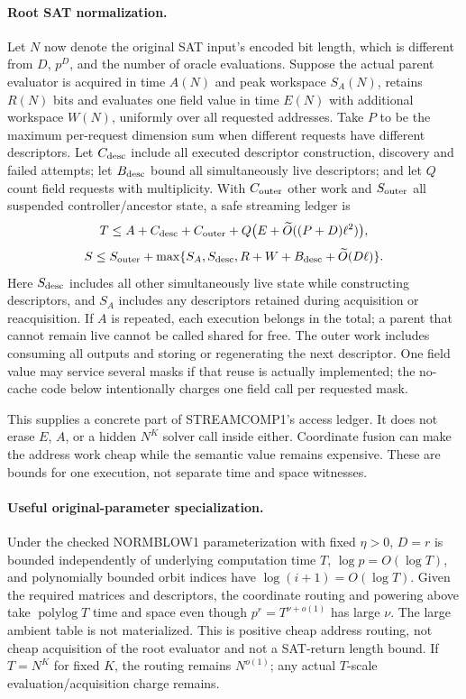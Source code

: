 \documentclass[11pt]{article}
\begin{document}
\paragraph{Root SAT normalization.}
Let $N$ now denote the original SAT input's encoded bit length, which is
different from $D$, $p^D$, and the number of oracle evaluations. Suppose
the actual parent evaluator is acquired in time $A(N)$ and peak workspace
$S_A(N)$, retains $R(N)$ bits and evaluates one field value in time
$E(N)$ with additional workspace $W(N)$, uniformly over all requested
addresses. Take $P$ to be the maximum per-request dimension sum when
different requests have different descriptors. Let $C_{\rm desc}$ include
all executed descriptor construction, discovery and failed attempts;
let $B_{\rm desc}$ bound all simultaneously live descriptors; and let
$Q$ count field requests with multiplicity. With $C_{\rm outer}$ other
work and $S_{\rm outer}$ all suspended controller/ancestor state, a safe
streaming ledger is
\[
 T\le A+C_{\rm desc}+C_{\rm outer}
       +Q\bigl(E+\widetilde O((P+D)\ell^2)\bigr),
\]
\[
 S\le S_{\rm outer}+\max\{S_A,S_{\rm desc},
 R+W+B_{\rm desc}+\widetilde O(D\ell)\}.
\]
Here $S_{\rm desc}$ includes all other simultaneously live state while
constructing descriptors, and $S_A$ includes any descriptors retained
during acquisition or reacquisition. If $A$ is repeated, each execution belongs in
the total; a parent that cannot remain live cannot be called shared for
free. The outer work includes consuming all outputs and storing or
regenerating the next descriptor. One field value may service several
masks if that reuse is actually implemented; the no-cache code below
intentionally charges one field call per requested mask.

This supplies a concrete part of STREAMCOMP1's access ledger. It does not
erase $E$, $A$, or a hidden $N^K$ solver call inside either. Coordinate
fusion can make the address work cheap while the semantic value remains
expensive. These are bounds for one execution, not separate time and
space witnesses.

\paragraph{Useful original-parameter specialization.}
Under the checked NORMBLOW1 parameterization with fixed $\eta>0$,
$D=r$ is bounded independently of underlying computation time $T$,
$\log p=O(\log T)$, and polynomially bounded orbit indices have
$\log(i+1)=O(\log T)$. Given the required matrices and descriptors,
the coordinate routing and powering above take $\operatorname{polylog}T$
time and space even though $p^r=T^{\nu+o(1)}$ has large $\nu$.
The large ambient table is not materialized. This is positive cheap
address routing, not cheap acquisition of the root evaluator and not a
SAT-return length bound. If $T=N^K$ for fixed $K$, the routing remains
$N^{o(1)}$; any actual $T$-scale evaluation/acquisition charge remains.
\end{document}

